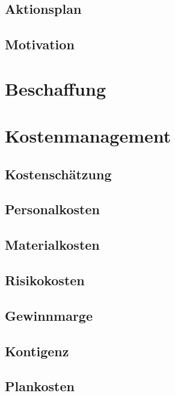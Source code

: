 \subsection{Aktionsplan}
\lipsum[2]
\subsection{Motivation} %
\lipsum[2]

\section{Beschaffung} %

\section{Kostenmanagement}
\lipsum[2]
\subsection{Kostenschätzung}
\lipsum[2]
\subsection{Personalkosten} %
\lipsum[2]
\subsection{Materialkosten}
\lipsum[2]
\subsection{Risikokosten}
\lipsum[2]
\subsection{Gewinnmarge}
\lipsum[2]
\subsection{Kontigenz} %
\lipsum[2]
\subsection{Plankosten}
\lipsum[2]





